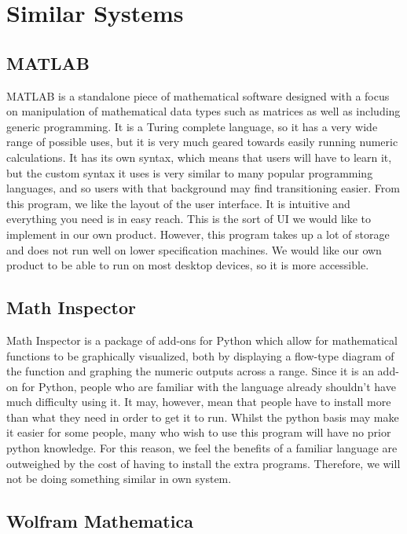 \documentclass[a4paper, oneside, 11pt]{report}
\begin{document}
\section{Similar Systems}

\subsection{MATLAB\cite{MATLAB}}

MATLAB is a standalone piece of mathematical software designed with a focus on manipulation of mathematical data types such as matrices as well as including generic programming. 
It is a Turing complete language, so it has a very wide range of possible uses, but it is very much geared towards easily running numeric calculations. It has its own syntax,
which means that users will have to learn it, but the custom syntax it uses is very similar to many popular programming languages, and so users with that background may find transitioning easier.
From this program, we like the layout of the user interface. It is intuitive and everything you need is in easy reach. This is the sort of UI we would like to implement in our own product.
However, this program takes up a lot of storage and does not run well on lower specification machines. We would like our own product to be able to run on most desktop devices, so it is more accessible.

\subsection{Math Inspector\cite{Math_Inspector}}

Math Inspector is a package of add-ons for Python which allow for mathematical functions to be graphically visualized, both by displaying a flow-type diagram of the function and graphing the numeric outputs across a range.
 Since it is an add-on for Python, people who are familiar with the language already shouldn't have much difficulty using it. It may, however, mean that people have to install more than what they need in order to get it to run.
Whilst the python basis may make it easier for some people, many who wish to use this program will have no prior python knowledge. For this reason, we feel the benefits of a familiar language are outweighed by the cost of having to install the extra programs. Therefore, we will not be doing something similar in own system.

\subsection{Wolfram Mathematica\cite{Mathematica}}
\end{document}

